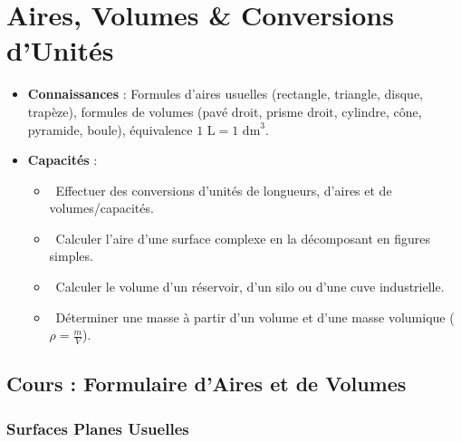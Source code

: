 \chapter{Aires, Volumes \& Conversions d'Unités}
\label{chap:aires_volumes}

\begin{cadreretenu}
\begin{itemize}
    \item \textbf{Connaissances} : Formules d'aires usuelles (rectangle, triangle, disque, trapèze), formules de volumes (pavé droit, prisme droit, cylindre, cône, pyramide, boule), équivalence $1\text{ L} = 1\text{ dm}^3$.
    \item \textbf{Capacités} :
    \begin{itemize}
        \item \capRealiser\ Effectuer des conversions d'unités de longueurs, d'aires et de volumes/capacités.
        \item \capRealiser\ Calculer l'aire d'une surface complexe en la décomposant en figures simples.
        \item \capRealiser\ Calculer le volume d'un réservoir, d'un silo ou d'une cuve industrielle.
        \item \capAnalyser\ Déterminer une masse à partir d'un volume et d'une masse volumique ($\rho = \frac{m}{V}$).
    \end{itemize}
\end{itemize}
\end{cadreretenu}

\vspace{0.3cm}

\section{Cours : Formulaire d'Aires et de Volumes}

\subsection{Surfaces Planes Usuelles}

